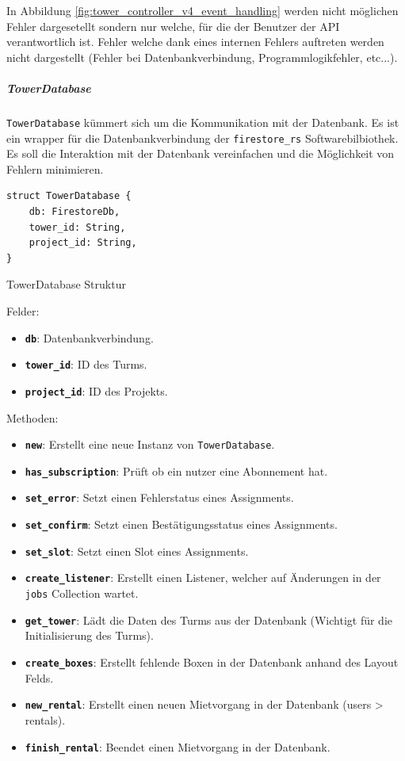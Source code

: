 In Abbildung \ref{fig:tower_controller_v4_event_handling} werden nicht möglichen Fehler dargesetellt sondern nur welche, für die der Benutzer der API verantwortlich ist. Fehler welche dank eines internen Fehlers auftreten werden nicht dargestellt (Fehler bei Datenbankverbindung, Programmlogikfehler, etc...).

\clearpage

\subparagraph{TowerDatabase}

\texttt{TowerDatabase} kümmert sich um die Kommunikation mit der Datenbank. Es ist ein \Gls{wrapper} für die Datenbankverbindung der \texttt{firestore\_rs} Softwarebilbiothek. Es soll die Interaktion mit der Datenbank vereinfachen und die Möglichkeit von Fehlern minimieren.

\begin{listing}[H]
  \begin{verbatim}
struct TowerDatabase {
    db: FirestoreDb,
    tower_id: String,
    project_id: String,
}
  \end{verbatim}
  \caption{TowerDatabase Struktur}
  \label{lst:tower_database_struktur}
\end{listing}

Felder:
\begin{itemize}
  \item \textbf{\texttt{db}}: Datenbankverbindung.
  \item \textbf{\texttt{tower\_id}}: ID des Turms.
  \item \textbf{\texttt{project\_id}}: ID des Projekts.
\end{itemize}

Methoden:
\begin{itemize}
  \item \textbf{\texttt{new}}: Erstellt eine neue Instanz von \texttt{TowerDatabase}.
  \item \textbf{\texttt{has\_subscription}}: Prüft ob ein nutzer eine Abonnement hat.
  \item \textbf{\texttt{set\_error}}: Setzt einen Fehlerstatus eines Assignments.
  \item \textbf{\texttt{set\_confirm}}: Setzt einen Bestätigungsstatus eines Assignments.
  \item \textbf{\texttt{set\_slot}}: Setzt einen Slot eines Assignments.
  \item \textbf{\texttt{create\_listener}}: Erstellt einen Listener, welcher auf Änderungen in der \texttt{jobs} Collection wartet.
  \item \textbf{\texttt{get\_tower}}: Lädt die Daten des Turms aus der Datenbank (Wichtigt für die Initialisierung des Turms).
  \item \textbf{\texttt{create\_boxes}}: Erstellt fehlende Boxen in der Datenbank anhand des Layout Felds.
  \item \textbf{\texttt{new\_rental}}: Erstellt einen neuen Mietvorgang in der Datenbank (users > rentals).
  \item \textbf{\texttt{finish\_rental}}: Beendet einen Mietvorgang in der Datenbank.
\end{itemize}


